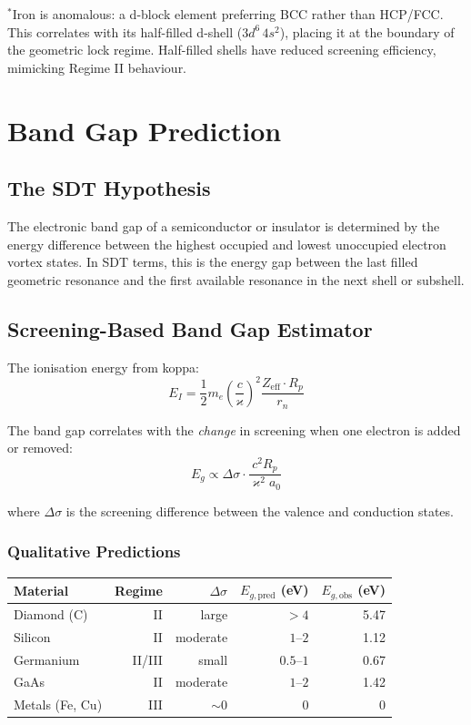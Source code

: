 \documentclass[12pt,a4paper]{report}
\newcommand{\kop}{\varkappa}
\begin{document}
$^*$Iron is anomalous: a d-block element preferring BCC rather than HCP/FCC. This correlates with its half-filled d-shell ($3d^6\,4s^2$), placing it at the boundary of the geometric lock regime. Half-filled shells have reduced screening efficiency, mimicking Regime II behaviour.


\chapter{Band Gap Prediction}
\label{ch:bandgap}

\section{The SDT Hypothesis}

The electronic band gap of a semiconductor or insulator is determined by the energy difference between the highest occupied and lowest unoccupied electron vortex states. In SDT terms, this is the energy gap between the last filled geometric resonance and the first available resonance in the next shell or subshell.

\section{Screening-Based Band Gap Estimator}

The ionisation energy from koppa:
\begin{equation}
  E_I = \frac{1}{2} m_e \left(\frac{c}{\kop}\right)^2 \frac{Z_{\text{eff}} \cdot R_p}{r_n}
\end{equation}

The band gap correlates with the \emph{change} in screening when one electron is added or removed:
\begin{equation}
  E_g \propto \Delta\sigma \cdot \frac{c^2 R_p}{\kop^2 a_0}
\end{equation}

where $\Delta\sigma$ is the screening difference between the valence and conduction states.

\subsection{Qualitative Predictions}

\begin{center}
\begin{tabular}{lrrrr}
\toprule
\textbf{Material} & \textbf{Regime} & $\Delta\sigma$ & $E_{g,\text{pred}}$ (eV) & $E_{g,\text{obs}}$ (eV) \\
\midrule
Diamond (C)  & II & large & $>4$ & 5.47 \\
Silicon      & II & moderate & $1$--$2$ & 1.12 \\
Germanium    & II/III & small & $0.5$--$1$ & 0.67 \\
GaAs         & II & moderate & $1$--$2$ & 1.42 \\
Metals (Fe, Cu) & III & $\sim 0$ & 0 & 0 \\
\bottomrule
\end{tabular}
\end{center}
\end{document}
